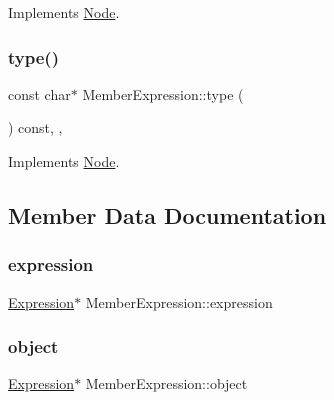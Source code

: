 Implements \hyperlink{struct_node_a10bd7af968140bbf5fa461298a969c71}{Node}.

\mbox{\label{struct_member_expression_a2b3653ea6c4b7447d3eebf21d528d847}} 
\subsubsection{\texorpdfstring{type()}{type()}}
{\footnotesize\ttfamily const char$\ast$ Member\+Expression\+::type (\begin{DoxyParamCaption}{ }\end{DoxyParamCaption}) const\hspace{0.3cm}{\ttfamily [inline]}, {\ttfamily [override]}, {\ttfamily [virtual]}}



Implements \hyperlink{struct_node_a82f29420d0a38efcc370352528e94e9b}{Node}.



\subsection{Member Data Documentation}
\mbox{\label{struct_member_expression_a81b4f3183db07b7b9350f9199ce5fc97}} 
\subsubsection{\texorpdfstring{expression}{expression}}
{\footnotesize\ttfamily \hyperlink{struct_expression}{Expression}$\ast$ Member\+Expression\+::expression}

\mbox{\label{struct_member_expression_a338f9515daed926c07fd717b9b728f58}} 
\subsubsection{\texorpdfstring{object}{object}}
{\footnotesize\ttfamily \hyperlink{struct_expression}{Expression}$\ast$ Member\+Expression\+::object}

